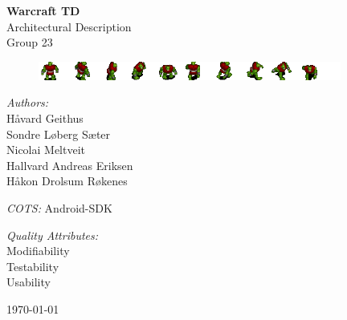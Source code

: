 \begin{titlepage}
\begin{center}

\vspace{10 mm}
{ \huge\bfseries Warcraft TD}\\[0.4cm]
Architectural Description\\
Group 23
\begin{figure}[h]
	\center
	\includegraphics[scale=2]{images/peons}
\end{figure}

\vfill
\begin{minipage}{0.4\textwidth}
\begin{flushleft} \large
\emph{Authors:}\\
Håvard Geithus\\ 
Sondre Løberg Sæter\\ 
Nicolai Meltveit\\
Hallvard Andreas Eriksen\\
Håkon Drolsum Røkenes\\
\end{flushleft}
\end{minipage}
\begin{minipage}{0.4\textwidth}
\begin{flushright} \large
\emph{COTS:} Android-SDK \vspace{5 mm}

\emph{Quality Attributes:} \\

Modifiability\\ Testability\\ Usability
\end{flushright}
\end{minipage}
\vspace{10 mm}








{\large \today}



\end{center}
\end{titlepage}
